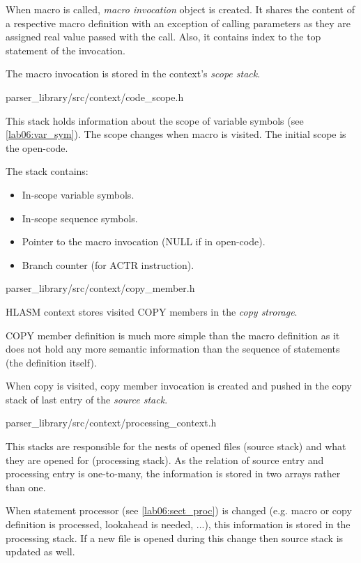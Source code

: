 When macro is called, \emph{macro invocation} object is created. It shares the content of a respective macro definition with an exception of calling parameters as they are assigned real value passed with the call. Also, it contains index to the top statement of the invocation.

The macro invocation is stored in the context's \emph{scope stack}.

{parser\_library/src/context/code\_scope.h}

This stack holds information about the scope of variable symbols (see \cref{lab06:var_sym}). The scope changes when macro is visited. The initial scope is the open-code. 


The stack contains:
\begin{itemize}
	\item In-scope variable symbols.
	\item In-scope sequence symbols.
	\item Pointer to the macro invocation (NULL if in open-code).
	\item Branch counter (for ACTR instruction).
\end{itemize}

{parser\_library/src/context/copy\_member.h}

HLASM context stores visited COPY members in the \emph{copy strorage}.

COPY member definition is much more simple than the macro definition as it does not hold any more semantic information than the sequence of statements (the definition itself).

When copy is visited, copy member invocation is created and pushed in the copy stack of last entry of the \emph{source stack}.

{parser\_library/src/context/processing\_context.h}

This stacks are responsible for the nests of opened files (source stack) and what they are opened for (processing stack). As the relation of source entry and processing entry is one-to-many, the information is stored in two arrays rather than one.

When statement processor (see \cref{lab06:sect_proc}) is changed (e.g. macro or copy definition is processed, lookahead is needed, ...), this information is stored in the processing stack. If a new file is opened during this change then source stack is updated as well.

